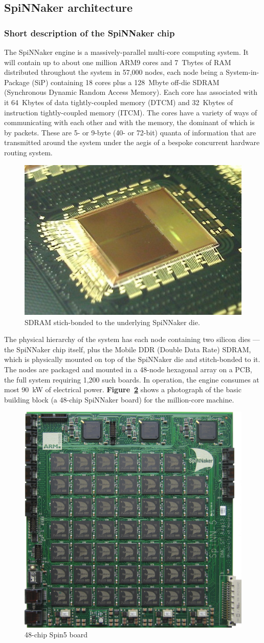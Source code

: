 \documentclass[a4paper, 11pt]{article}
\begin{document}
\subsection{SpiNNaker architecture}

\subsubsection{Short description of the SpiNNaker chip}
The SpiNNaker engine is a massively-parallel multi-core computing system. It will contain up to about one million ARM9 cores and 7~Tbytes of RAM distributed throughout the system in 57,000 nodes, each node being a System-in-Package (SiP) containing 18 cores plus a 128~Mbyte off-die SDRAM (Synchronous Dynamic Random Access Memory). Each core has associated with it 64~Kbytes of data tightly-coupled memory (DTCM) and 32~Kbytes of instruction tightly-coupled memory (ITCM). The cores have a variety of ways of communicating with each other and with the memory, the dominant of which is by packets. These are 5- or 9-byte (40- or 72-bit) quanta of information that are transmitted around the system under the aegis of a bespoke concurrent hardware routing system. 

\begin{figure}[htbp]
	\centering
	\includegraphics[width=0.25\linewidth]{images/spinnaker_die.jpg}
	\caption{SDRAM stich-bonded to the underlying SpiNNaker die.}
	\label{fig:spin5}
\end{figure}

The physical hierarchy of the system has each node containing two silicon dies --- the SpiNNaker chip itself, plus the Mobile DDR (Double Data Rate) SDRAM, which is physically mounted on top of the SpiNNaker die and stitch-bonded to it. The nodes are packaged and mounted in a 48-node hexagonal array on a PCB, the full system requiring 1,200 such boards. In operation, the engine consumes at most 90~kW of electrical power. \textbf{Figure~\ref{fig:spin5}} shows a photograph of the basic building block (a 48-chip SpiNNaker board) for the million-core machine.

\begin{figure}[htbp]
	\centering
	\includegraphics[width=0.45\linewidth]{images/spin5.jpg}
	\caption{48-chip Spin5 board}
	\label{fig:spin5}
\end{figure}
\end{document}
